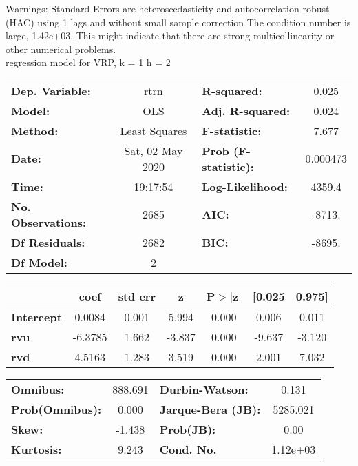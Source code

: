 Warnings: \newline
 [1] Standard Errors are heteroscedasticity and autocorrelation robust (HAC) using 1 lags and without small sample correction \newline
 [2] The condition number is large, 1.42e+03. This might indicate that there are \newline
 strong multicollinearity or other numerical problems.\\ 

regression model for VRP, k = 1 h = 2\begin{center}
\begin{tabular}{lclc}
\toprule
\textbf{Dep. Variable:}    &       rtrn       & \textbf{  R-squared:         } &     0.025   \\
\textbf{Model:}            &       OLS        & \textbf{  Adj. R-squared:    } &     0.024   \\
\textbf{Method:}           &  Least Squares   & \textbf{  F-statistic:       } &     7.677   \\
\textbf{Date:}             & Sat, 02 May 2020 & \textbf{  Prob (F-statistic):} &  0.000473   \\
\textbf{Time:}             &     19:17:54     & \textbf{  Log-Likelihood:    } &    4359.4   \\
\textbf{No. Observations:} &        2685      & \textbf{  AIC:               } &    -8713.   \\
\textbf{Df Residuals:}     &        2682      & \textbf{  BIC:               } &    -8695.   \\
\textbf{Df Model:}         &           2      & \textbf{                     } &             \\
\bottomrule
\end{tabular}
\begin{tabular}{lcccccc}
                   & \textbf{coef} & \textbf{std err} & \textbf{z} & \textbf{P$> |$z$|$} & \textbf{[0.025} & \textbf{0.975]}  \\
\midrule
\textbf{Intercept} &       0.0084  &        0.001     &     5.994  &         0.000        &        0.006    &        0.011     \\
\textbf{rvu}       &      -6.3785  &        1.662     &    -3.837  &         0.000        &       -9.637    &       -3.120     \\
\textbf{rvd}       &       4.5163  &        1.283     &     3.519  &         0.000        &        2.001    &        7.032     \\
\bottomrule
\end{tabular}
\begin{tabular}{lclc}
\textbf{Omnibus:}       & 888.691 & \textbf{  Durbin-Watson:     } &    0.131  \\
\textbf{Prob(Omnibus):} &   0.000 & \textbf{  Jarque-Bera (JB):  } & 5285.021  \\
\textbf{Skew:}          &  -1.438 & \textbf{  Prob(JB):          } &     0.00  \\
\textbf{Kurtosis:}      &   9.243 & \textbf{  Cond. No.          } & 1.12e+03  \\
\bottomrule
\end{tabular}
\end{center}

